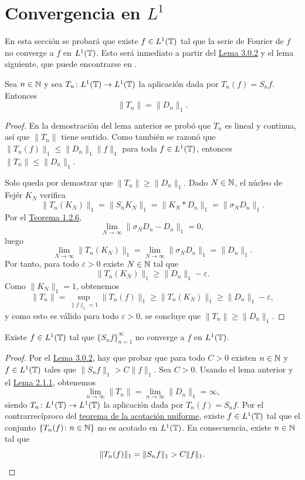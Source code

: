 \documentclass[a4paper, 12pt]{book}
\begin{document}
\section[Convergencia en \texorpdfstring{$L^1$}{L1}]{Convergencia en \texorpdfstring{\boldmath$L^1$}{L1}}

En esta sección se probará que existe $f \in L^1(\mathbb T)$ tal que la serie de Fourier de $f$ no converge a $f$ en $L^1(\mathbb T)$. Esto será inmediato a partir del \hyperref[3.0.2]{Lema 3.0.2} y el lema siguiente, que puede encontrarse en \cite{katznelson}.

\begin{lemma}
    Sea $n \in \mathbb N$ y sea $T_n \colon L^1(\mathbb T) \to L^1(\mathbb T)$ la aplicación dada por $T_n(f) = S_nf$. Entonces
    \[\|T_n\| = \|D_n\|_1.\]
\end{lemma}

\begin{proof}
    En la demostración del lema anterior se probó que $T_n$ es lineal y continua, así que $\|T_n\|$ tiene sentido. Como también se razonó que $\|T_n(f)\|_1 \leq \|D_n\|_1\|f\|_1$ para toda $f \in L^1(\mathbb T)$, entonces $\|T_n\| \leq \|D_n\|_1$. 
    
    Solo queda por demostrar que $\|T_n\|\geq \|D_n\|_1$. Dado $N \in \mathbb N$, el núcleo de Fejér $K_N$ verifica
    \[\|T_n(K_N)\|_1 = \|S_nK_N\|_1 = \|K_N \ast D_n\|_1 = \|\sigma_ND_n\|_1.\]
    Por el \hyperref[1.2.6]{Teorema 1.2.6},
    \[\lim_{N\to\infty} \|\sigma_ND_n-D_n\|_1 = 0,\]
    luego
    \[\lim_{N\to\infty} \|T_n(K_N)\|_1 = \lim_{N\to\infty} \|\sigma_ND_n\|_1 = \|D_n\|_1.\]
    Por tanto, para todo $\varepsilon > 0$ existe $N \in \mathbb N$ tal que 
    \[\|T_n(K_{N})\|_1 \geq \|D_n\|_1-\varepsilon.\]
    Como $\|K_N\|_1=1$, obtenemos
    \[\|T_n\| = \sup_{\|f\|_1=1} \|T_n(f)\|_1 \geq \|T_n(K_N)\|_1 \geq \|D_n\|_1-\varepsilon,\]
    y como esto es válido para todo $\varepsilon>0$, se concluye que $\|T_n\| \geq \|D_n\|_1$.
\end{proof}

\begin{theorem}
    Existe $f \in L^1(\mathbb T)$ tal que $\{S_nf\}_{n=1}^\infty$ no converge a $f$ en $L^1(\mathbb T)$.
\end{theorem}

\begin{proof}
    Por el \hyperref[3.0.2]{Lema 3.0.2}, hay que probar que para todo $C > 0$ existen $n \in \mathbb N$ y $f \in L^1(\mathbb T)$ tales que $\|S_nf\|_1 > C\|f\|_1$. Sea $C>0$. Usando el lema anterior y el \hyperref[2.1.1]{Lema 2.1.1}, obtenemos
    \[\lim_{n\to\infty} \|T_n\| = \lim_{n\to\infty}\|D_n\|_1 = \infty,\]
    siendo $T_n \colon L^1(\mathbb T) \to L^1(\mathbb T)$ la aplicación dada por $T_n(f) = S_nf$. Por el contrarrecíproco del \hyperref[1.3.1]{teorema de la acotación uniforme}, existe $f \in L^1(\mathbb T)$ tal que el conjunto $\{T_n(f) \colon n \in \mathbb N\}$ no es acotado en $L^1(\mathbb T)$. En consecuencia, existe $n \in \mathbb N$ tal que
    \[\|T_n(f)\|_1 = \|S_nf\|_1 > C\|f\|_1. \qedhere\]
\end{proof}
\end{document}
